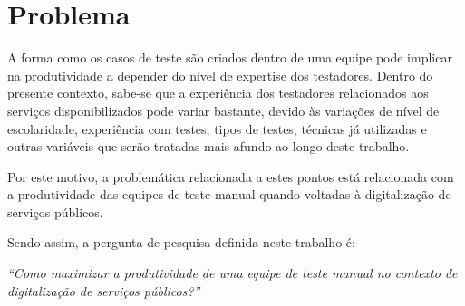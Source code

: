 \section{Problema}

A forma como os casos de teste são criados dentro de uma equipe pode implicar na produtividade a depender do nível de expertise dos
testadores. Dentro do presente contexto, sabe-se que a experiência dos testadores relacionados aos serviços disponibilizados
pode variar bastante, devido às variações de nível de escolaridade, experiência com testes, tipos de testes, técnicas já utilizadas
e outras variáveis que serão tratadas mais afundo ao longo deste trabalho.

Por este motivo, a problemática relacionada a estes pontos está relacionada com a produtividade das equipes de teste manual quando voltadas à digitalização de serviços públicos. 


Sendo assim, a pergunta de pesquisa definida neste trabalho é:

\textit{``Como maximizar a produtividade de uma equipe de teste manual no contexto de digitalização de serviços públicos?''}